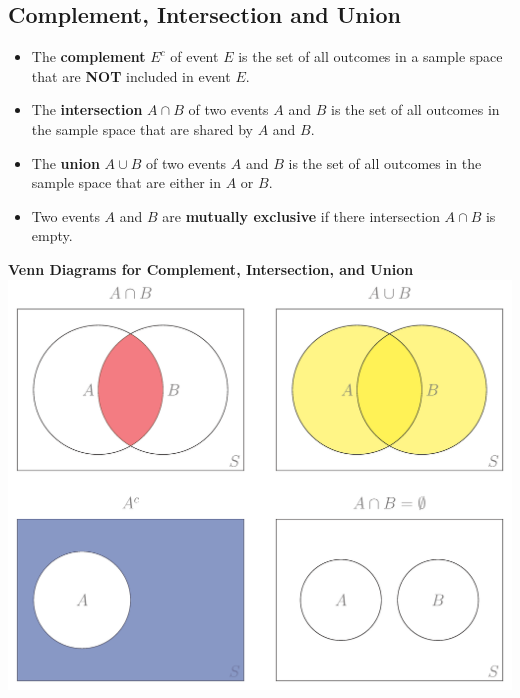 \hypertarget{complement-intersection-and-union}{%
\subsection{Complement, Intersection and
Union}\label{complement-intersection-and-union}}

\begin{itemize}
\item
  The \textbf{complement} \(E^c\) of event \(E\) is the set of all
  outcomes in a sample space that are \textbf{NOT} included in event
  \(E\).
\item
  The \textbf{intersection} \(A\cap B\) of two events \(A\) and \(B\) is
  the set of all outcomes in the sample space that are shared by \(A\)
  and \(B\).
\item
  The \textbf{union} \(A\cup B\) of two events \(A\) and \(B\) is the
  set of all outcomes in the sample space that are either in \(A\) or
  \(B\).
\item
  Two events \(A\) and \(B\) are \textbf{mutually exclusive} if there
  intersection \(A\cap B\) is empty.
\end{itemize}

  \begin{center}
    \textbf{Venn Diagrams for Complement, Intersection, and Union}\\
    \includegraphics[scale=0.6]{Figures/VennDiagrams.png}
  \end{center}

